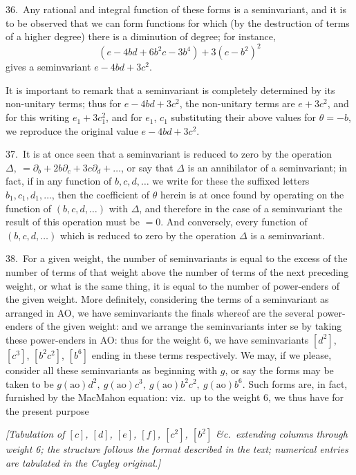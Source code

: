 \documentclass[11pt]{article}
\begin{document}
36.\ Any rational and integral function of these forms is a seminvariant, and it is to be observed that we can form functions for which (by the destruction of terms of a higher degree) there is a diminution of degree; for instance,
\[
(e - 4bd + 6b^2 c - 3b^4) + 3(c - b^2)^2
\]
gives a seminvariant $e - 4bd + 3c^2$.

It is important to remark that a seminvariant is completely determined by its non-unitary terms; thus for $e - 4bd + 3c^2$, the non-unitary terms are $e + 3c^2$, and for this writing $e_1 + 3c_1^2$, and for $e_1$, $c_1$ substituting their above values for $\theta = -b$, we reproduce the original value $e - 4bd + 3c^2$.

37.\ It is at once seen that a seminvariant is reduced to zero by the operation $\Delta,\ = \partial_b + 2b\partial_c + 3c\partial_d + \ldots$, or say that $\Delta$ is an annihilator of a seminvariant; in fact, if in any function of $b, c, d, \ldots$ we write for these the suffixed letters $b_1, c_1, d_1, \ldots$, then the coefficient of $\theta$ herein is at once found by operating on the function of $(b, c, d, \ldots)$ with $\Delta$, and therefore in the case of a seminvariant the result of this operation must be $= 0$. And conversely, every function of $(b, c, d, \ldots)$ which is reduced to zero by the operation $\Delta$ is a seminvariant.

38.\ For a given weight, the number of seminvariants is equal to the excess of the number of terms of that weight above the number of terms of the next preceding weight, or what is the same thing, it is equal to the number of power-enders of the given weight. More definitely, considering the terms of a seminvariant as arranged in AO, we have seminvariants the finals whereof are the several power-enders of the given weight: and we arrange the seminvariants inter se by taking these power-enders in AO: thus for the weight 6, we have seminvariants $[d^2]$, $[c^3]$, $[b^2 c^2]$, $[b^6]$ ending in these terms respectively. We may, if we please, consider all these seminvariants as beginning with $g$, or say the forms may be taken to be
$g(\text{ao}) d^2,\ g(\text{ao}) c^3,\ g(\text{ao}) b^2 c^2,\ g(\text{ao}) b^6.$ Such forms are, in fact, furnished by the MacMahon equation: viz.\ up to the weight 6, we thus have for the present purpose

\begin{center}
\textit{[Tabulation of $[c]$, $[d]$, $[e]$, $[f]$, $[c^2]$, $[b^2]$ \&c.\ extending columns through weight 6; the structure follows the format described in the text; numerical entries are tabulated in the Cayley original.]}
\end{center}
\end{document}
